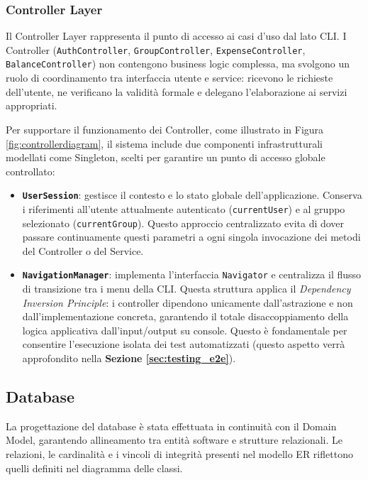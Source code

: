 \subsubsection{Controller Layer}
Il Controller Layer rappresenta il punto di accesso ai casi d’uso dal lato CLI. 
I Controller (\texttt{AuthController}, \texttt{GroupController}, \texttt{ExpenseController}, \texttt{BalanceController}) non contengono business logic complessa, ma svolgono un ruolo di coordinamento tra interfaccia utente e service: 
ricevono le richieste dell’utente, ne verificano la validità formale e delegano l’elaborazione ai servizi appropriati.

Per supportare il funzionamento dei Controller, come illustrato in Figura \ref{fig:controllerdiagram}, il sistema include due componenti infrastrutturali modellati come Singleton, scelti per garantire un punto di accesso globale controllato:
\begin{itemize}
\item \textbf{\texttt{UserSession}}: gestisce il contesto e lo stato globale dell'applicazione. 
Conserva i riferimenti all'utente attualmente autenticato (\texttt{currentUser}) e al gruppo selezionato (\texttt{currentGroup}). 
Questo approccio centralizzato evita di dover passare continuamente questi parametri a ogni singola invocazione dei metodi del Controller o del Service.

\item \textbf{\texttt{NavigationManager}}: implementa l'interfaccia \texttt{Navigator} e centralizza il flusso di transizione tra i menu della CLI. 
Questa struttura applica il \textit{Dependency Inversion Principle}: i controller dipendono unicamente dall'astrazione e non dall'implementazione concreta, garantendo il totale disaccoppiamento della logica applicativa dall'input/output su console.
Questo è fondamentale per consentire l'esecuzione isolata dei test automatizzati (questo aspetto verrà approfondito nella \textbf{Sezione \ref{sec:testing_e2e}}).
\end{itemize}


\subsection{Database}
La progettazione del database è stata effettuata in continuità
con il Domain Model, garantendo allineamento tra entità software
e strutture relazionali. Le relazioni, le cardinalità e i vincoli
di integrità presenti nel modello ER riflettono quelli definiti
nel diagramma delle classi.

